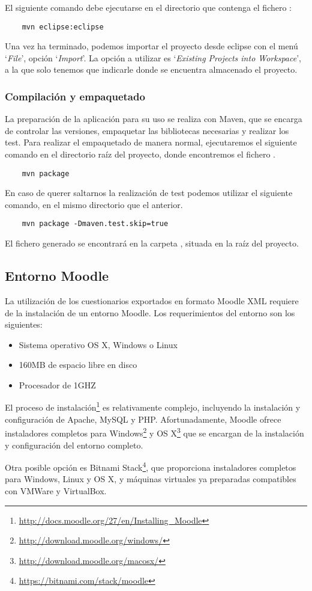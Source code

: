 El siguiente comando debe ejecutarse en el directorio que contenga el fichero :
\begin{verbatim}
	mvn eclipse:eclipse
\end{verbatim}
Una vez ha terminado, podemos importar el proyecto desde eclipse con el menú `\emph{File}', opción `\emph{Import}'.
La opción a utilizar es `\emph{Existing Projects into Workspace}', a la que solo tenemos que indicarle donde se encuentra almacenado el proyecto.

\subsubsection{Compilación y empaquetado}
La preparación de la aplicación para su uso se realiza con Maven, que se encarga de controlar las versiones, empaquetar las bibliotecas necesarias y realizar los test.
Para realizar el empaquetado de manera normal, ejecutaremos el siguiente comando en el directorio raíz del proyecto, donde encontremos el fichero .
\begin{verbatim}
	mvn package
\end{verbatim}
En caso de querer saltarnos la realización de test podemos utilizar el siguiente comando, en el mismo directorio que el anterior.
\begin{verbatim}
	mvn package -Dmaven.test.skip=true
\end{verbatim}
El fichero  generado se encontrará en la carpeta , situada en la raíz del proyecto.

\subsection{Entorno Moodle}
La utilización de los cuestionarios exportados en formato Moodle XML requiere de la instalación de un entorno Moodle.
Los requerimientos del entorno son los siguientes:
\begin{itemize}
	\item Sistema operativo OS X, Windows o Linux
	\item 160MB de espacio libre en disco
	\item Procesador de 1GHZ
\end{itemize}

El proceso de instalación\footnote{\url{http://docs.moodle.org/27/en/Installing\_Moodle}} es relativamente complejo, incluyendo la instalación y configuración de Apache, MySQL y PHP.
Afortunadamente, Moodle ofrece instaladores completos para Windows\footnote{\url{http://download.moodle.org/windows/}} y OS X\footnote{\url{http://download.moodle.org/macosx/}} que se encargan de la instalación y configuración del entorno completo.

Otra posible opción es Bitnami Stack\footnote{\url{https://bitnami.com/stack/moodle}}, que proporciona instaladores completos para Windows, Linux y OS X, y máquinas virtuales ya preparadas compatibles con VMWare y VirtualBox.